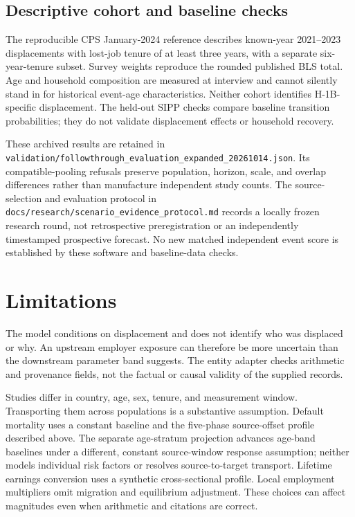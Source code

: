 \documentclass[10pt]{article}
\begin{document}
\subsection{Descriptive cohort and baseline checks}
The reproducible CPS January-2024 reference describes known-year
2021--2023 displacements with lost-job tenure of at least three years,
with a separate six-year-tenure subset. Survey weights reproduce the
rounded published BLS total. Age and household composition are measured
at interview and cannot silently stand in for historical event-age
characteristics. Neither cohort identifies H-1B-specific displacement.
The held-out SIPP checks compare baseline transition probabilities;
they do not validate displacement effects or household recovery.

These archived results are retained in
\nolinkurl{validation/followthrough_evaluation_expanded_20261014.json}.
Its compatible-pooling refusals preserve population, horizon, scale, and
overlap differences rather than manufacture independent study counts.
The source-selection and evaluation protocol in
\nolinkurl{docs/research/scenario_evidence_protocol.md} records a locally frozen
research round, not retrospective preregistration or an independently
timestamped prospective forecast. No new matched independent event score
is established by these software and baseline-data checks.

\FloatBarrier
\section{Limitations}
The model conditions on displacement and does not identify who was
displaced or why. An upstream employer exposure can therefore be more
uncertain than the downstream parameter band suggests. The entity
adapter checks arithmetic and provenance fields, not the factual or
causal validity of the supplied records.

Studies differ in country, age, sex, tenure, and measurement window.
Transporting them across populations is a substantive assumption.
Default mortality uses a constant baseline and the five-phase source-offset
profile described above. The separate age-stratum projection advances
age-band baselines under a different, constant source-window response
assumption; neither models individual risk factors or resolves source-to-target
transport. Lifetime earnings conversion uses a synthetic
cross-sectional profile. Local employment multipliers omit migration
and equilibrium adjustment. These choices can affect magnitudes even
when arithmetic and citations are correct.
\end{document}
